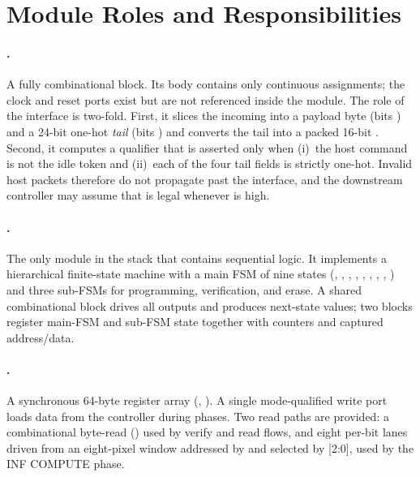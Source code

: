 \section{Module Roles and Responsibilities}
\label{sec:arch-modules}

\paragraph{.}
A fully combinational block. Its body contains only continuous assignments;
the clock and reset ports exist but are not referenced inside the module.
The role of the interface is two-fold. First, it slices the incoming
 into a payload byte (bits \sv{[31:24]}) and a 24-bit
one-hot \emph{tail} (bits \sv{[23:0]}) and converts the tail into a packed
16-bit . Second, it computes a  qualifier
that is asserted only when (i)~the host command is not the idle token
 and (ii)~each of the four tail fields is strictly one-hot.
Invalid host packets therefore do not propagate past the interface, and
the downstream controller may assume that  is legal
whenever  is high.

\paragraph{.}
The only module in the stack that contains sequential logic. It
implements a hierarchical finite-state machine with a main FSM of nine
states (, , ,
, , ,
, , )
and three sub-FSMs for programming, verification, and erase. A shared
combinational block drives all outputs and produces next-state values;
two  blocks register main-FSM and sub-FSM state together
with counters and captured address/data.

\paragraph{.}
A synchronous 64-byte register array (,
). A single mode-qualified write port loads
data from the controller during  phases. Two read
paths are provided: a combinational byte-read () used
by verify and read flows, and eight per-bit lanes driven from an
eight-pixel window addressed by  and selected by
[2:0], used by the INF COMPUTE phase.

